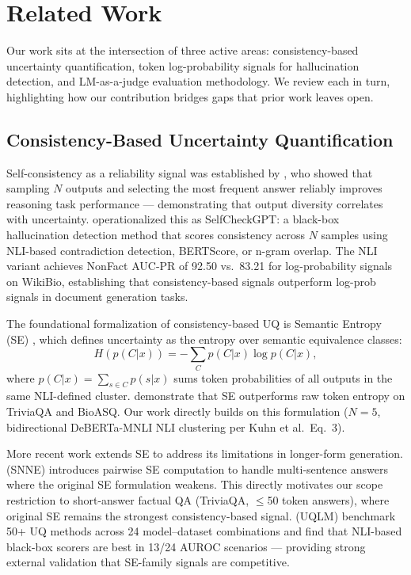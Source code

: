 \section{Related Work}
\label{sec:related}

Our work sits at the intersection of three active areas: consistency-based uncertainty quantification, token log-probability signals for hallucination detection, and LM-as-a-judge evaluation methodology. We review each in turn, highlighting how our contribution bridges gaps that prior work leaves open.

\subsection{Consistency-Based Uncertainty Quantification}

Self-consistency as a reliability signal was established by \citet{wang2022self}, who showed that sampling $N$ outputs and selecting the most frequent answer reliably improves reasoning task performance --- demonstrating that output diversity correlates with uncertainty. \citet{manakul2023selfcheck} operationalized this as SelfCheckGPT: a black-box hallucination detection method that scores consistency across $N$ samples using NLI-based contradiction detection, BERTScore, or n-gram overlap. The NLI variant achieves NonFact AUC-PR of 92.50 vs.\ 83.21 for log-probability signals on WikiBio, establishing that consistency-based signals outperform log-prob signals in document generation tasks.

The foundational formalization of consistency-based UQ is Semantic Entropy (SE) \citep{kuhn2023semantic}, which defines uncertainty as the entropy over semantic equivalence classes:
\[
H(p(C|x)) = -\sum_{C} p(C|x) \log p(C|x),
\]
where $p(C|x) = \sum_{s \in C} p(s|x)$ sums token probabilities of all outputs in the same NLI-defined cluster. \citet{kuhn2023semantic} demonstrate that SE outperforms raw token entropy on TriviaQA and BioASQ. Our work directly builds on this formulation ($N=5$, bidirectional DeBERTa-MNLI NLI clustering per Kuhn et al.\ Eq.~3).

More recent work extends SE to address its limitations in longer-form generation. \citet{nguyen2025beyond} (SNNE) introduces pairwise SE computation to handle multi-sentence answers where the original SE formulation weakens. This directly motivates our scope restriction to short-answer factual QA (TriviaQA, $\leq$50 token answers), where original SE remains the strongest consistency-based signal. \citet{bouchard2025uncertainty} (UQLM) benchmark 50+ UQ methods across 24 model--dataset combinations and find that NLI-based black-box scorers are best in 13/24 AUROC scenarios --- providing strong external validation that SE-family signals are competitive.

